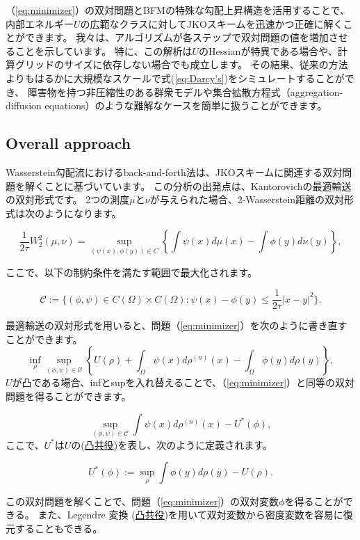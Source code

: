 \documentclass{jsarticle}
\theoremstyle{definition}
\begin{document}
{\color{red}
（\ref{eq:minimizer}）の双対問題とBFMの特殊な勾配上昇構造を活用することで、内部エネルギー$U$の広範なクラスに対してJKOスキームを迅速かつ正確に解くことができます。
我々は、アルゴリズムが各ステップで双対問題の値を増加させることを示しています。
特に、この解析は$U$のHessianが特異である場合や、計算グリッドのサイズに依存しない場合でも成立します。
その結果、従来の方法よりもはるかに大規模なスケールで式(\ref{eq:Darcy's})をシミュレートすることができ、
障害物を持つ非圧縮性のある群衆モデルや集合拡散方程式（aggregation-diffusion equations）のような難解なケースを簡単に扱うことができます。
}

\subsection{Overall approach}

Wasserstein勾配流におけるback-and-forth法は、JKOスキームに関連する双対問題を解くことに基づいています。
この分析の出発点は、Kantorovichの最適輸送の双対形式です。
2つの測度$\mu$と$\nu$が与えられた場合、2-Wasserstein距離の双対形式は次のようになります。

\begin{equation}
    \frac{1}{2 \tau}W_2^2(\mu, \nu) = \sup_{(\psi(x), \phi(y)) \in C}  \left\{ \int \psi(x) d\mu(x) - \int \phi(y) d\nu(y) \right\},
\end{equation}

ここで、以下の制約条件を満たす範囲で最大化されます。

$$
    \mathcal{C}  := \{(\phi, \psi) \in C(\Omega) \times C(\Omega) : \psi(x) - \phi(y) \leq \frac{1}{2 \tau} |x - y|^2 \}. 
$$
\vspace\baselineskip 

{\color{teal}
最適輸送の双対形式を用いると、問題（\ref{eq:minimizer}）を次のように書き直すことができます。
}
\[ \inf_{\rho} \sup_{(\phi,\psi) \in \mathcal{C}} \left\{ U(\rho) + \int_\Omega \psi(x) d\rho^(n)(x) - \int_\Omega \phi(y) d\rho(y) \right\}, \]
$U$が凸である場合、infとsupを入れ替えることで、（\ref{eq:minimizer}）と同等の双対問題を得ることができます。

\begin{equation}
    \label{eq:dual}
    \sup_{(\phi,\psi) \in \mathcal{C}} \int \psi(x) d\rho^{(n)}(x) - U^*(\phi) ,
\end{equation} 
ここで、$U^*$は$U$の(\hyperlink{凸共役}{凸共役})を表し、次のように定義されます。

$$
    U^*(\phi) := \sup_\rho \int \phi(y) d\rho(y) - U(\rho) .
$$

この双対問題を解くことで、問題（\ref{eq:minimizer}）の双対変数$\phi$を得ることができる。
また、Legendre 変換 (\hyperlink{凸共役}{凸共役})を用いて双対変数から密度変数を容易に復元することもできる。\\
\end{document}
